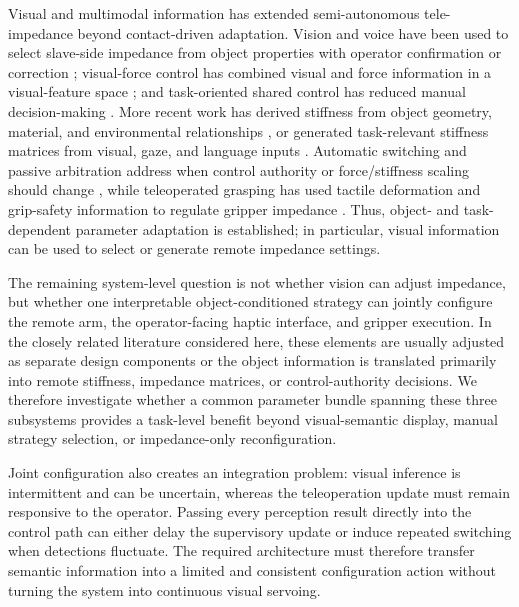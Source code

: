 Visual and multimodal information has extended semi-autonomous tele-impedance beyond contact-driven adaptation. Vision and voice have been used to select slave-side impedance from object properties with operator confirmation or correction \cite{ref10}; visual-force control has combined visual and force information in a visual-feature space \cite{ref11}; and task-oriented shared control has reduced manual decision-making \cite{ref12}. More recent work has derived stiffness from object geometry, material, and environmental relationships \cite{ref13}, or generated task-relevant stiffness matrices from visual, gaze, and language inputs \cite{ref14}. Automatic switching and passive arbitration address when control authority or force/stiffness scaling should change \cite{ref15,ref16}, while teleoperated grasping has used tactile deformation and grip-safety information to regulate gripper impedance \cite{ref30}. Thus, object- and task-dependent parameter adaptation is established; in particular, visual information can be used to select or generate remote impedance settings.

The remaining system-level question is not whether vision can adjust impedance, but whether one interpretable object-conditioned strategy can jointly configure the remote arm, the operator-facing haptic interface, and gripper execution. In the closely related literature considered here, these elements are usually adjusted as separate design components or the object information is translated primarily into remote stiffness, impedance matrices, or control-authority decisions. We therefore investigate whether a common parameter bundle spanning these three subsystems provides a task-level benefit beyond visual-semantic display, manual strategy selection, or impedance-only reconfiguration.

Joint configuration also creates an integration problem: visual inference is intermittent and can be uncertain, whereas the teleoperation update must remain responsive to the operator. Passing every perception result directly into the control path can either delay the supervisory update or induce repeated switching when detections fluctuate. The required architecture must therefore transfer semantic information into a limited and consistent configuration action without turning the system into continuous visual servoing.

